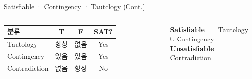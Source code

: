 \documentclass[10.5pt,compress]{beamer}
\begin{document}
\begin{frame}[t]{Satisfiable · Contingency · Tautology (Cont.)}
\begin{columns}[m, totalwidth=\textwidth]

        \centering
        \scriptsize
        \setlength{\tabcolsep}{8pt}
        \renewcommand{\arraystretch}{1.3}
        \begin{tabular}{lccc}
            \toprule
            분류 & \textbf{T} & \textbf{F} & \textbf{SAT?} \\
            \midrule
            \textcolor{accentblue}{Tautology}   & 항상 & 없음 & \textcolor{codegreen}{Yes} \\
            \textcolor{amber}{Contingency}      & 있음 & 있음 & \textcolor{codegreen}{Yes} \\
            \textcolor{codered}{Contradiction}  & 없음 & 항상 & \textcolor{codered}{No} \\
            \bottomrule
        \end{tabular}
        
        \vspace{0.3cm}
        \begin{exampleblock}{}
            \tiny %
            \centering
            \textbf{Satisfiable} $=$ Tautology $\cup$ Contingency\\
            \textbf{Unsatisfiable} $=$ Contradiction
        \end{exampleblock}
    \end{columns}
\end{frame}
\end{document}
